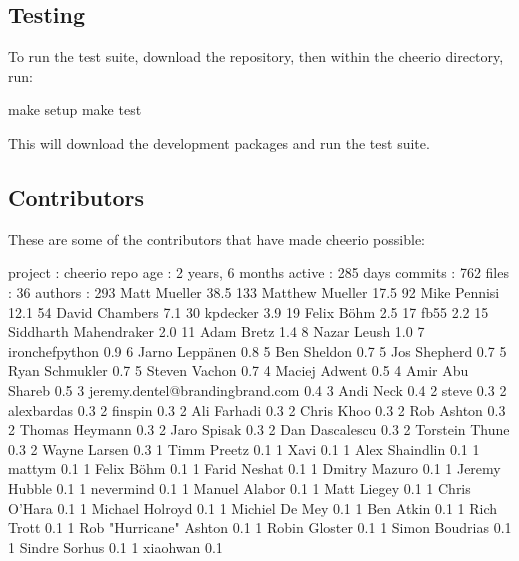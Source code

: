 \subsection*{Testing}

To run the test suite, download the repository, then within the cheerio directory, run\+:


\begin{DoxyCode}
make setup
make test
\end{DoxyCode}


This will download the development packages and run the test suite.

\subsection*{Contributors}

These are some of the contributors that have made cheerio possible\+:


\begin{DoxyCode}
project  : cheerio
 repo age : 2 years, 6 months
 active   : 285 days
 commits  : 762
 files    : 36
 authors  :
   293  Matt Mueller            38.5%
   133  Matthew Mueller         17.5%
    92  Mike Pennisi            12.1%
    54  David Chambers          7.1%
    30  kpdecker                3.9%
    19  Felix Böhm             2.5%
    17  fb55                    2.2%
    15  Siddharth Mahendraker   2.0%
    11  Adam Bretz              1.4%
     8  Nazar Leush             1.0%
     7  ironchefpython          0.9%
     6  Jarno Leppänen         0.8%
     5  Ben Sheldon             0.7%
     5  Jos Shepherd            0.7%
     5  Ryan Schmukler          0.7%
     5  Steven Vachon           0.7%
     4  Maciej Adwent           0.5%
     4  Amir Abu Shareb         0.5%
     3  jeremy.dentel@brandingbrand.com 0.4%
     3  Andi Neck               0.4%
     2  steve                   0.3%
     2  alexbardas              0.3%
     2  finspin                 0.3%
     2  Ali Farhadi             0.3%
     2  Chris Khoo              0.3%
     2  Rob Ashton              0.3%
     2  Thomas Heymann          0.3%
     2  Jaro Spisak             0.3%
     2  Dan Dascalescu          0.3%
     2  Torstein Thune          0.3%
     2  Wayne Larsen            0.3%
     1  Timm Preetz             0.1%
     1  Xavi                    0.1%
     1  Alex Shaindlin          0.1%
     1  mattym                  0.1%
     1  Felix Böhm            0.1%
     1  Farid Neshat            0.1%
     1  Dmitry Mazuro           0.1%
     1  Jeremy Hubble           0.1%
     1  nevermind               0.1%
     1  Manuel Alabor           0.1%
     1  Matt Liegey             0.1%
     1  Chris O'Hara            0.1%
     1  Michael Holroyd         0.1%
     1  Michiel De Mey          0.1%
     1  Ben Atkin               0.1%
     1  Rich Trott              0.1%
     1  Rob "Hurricane" Ashton  0.1%
     1  Robin Gloster           0.1%
     1  Simon Boudrias          0.1%
     1  Sindre Sorhus           0.1%
     1  xiaohwan                0.1%
\end{DoxyCode}


